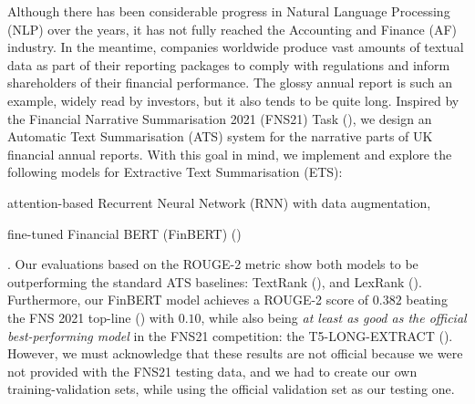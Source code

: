 Although there has been considerable progress in Natural Language Processing (NLP) over the years, it has not fully reached the Accounting and Finance (AF) industry.
In the meantime, companies worldwide produce vast amounts of textual data as part of their reporting packages to comply with regulations and inform shareholders of their financial performance.
The glossy annual report is such an example, widely read by investors, but it also tends to be quite long.
Inspired by the Financial Narrative Summarisation 2021 (FNS21) Task (\cite{zmandar-etal-2021-financial}),
we design an Automatic Text Summarisation (ATS) system for the narrative parts of UK financial annual reports.
With this goal in mind, we implement and explore the following models for Extractive Text Summarisation (ETS):
\begin{enumerate*}
    \item attention-based Recurrent Neural Network (RNN) with data augmentation,
    \item fine-tuned Financial BERT (FinBERT) (\cite{yang2020finbert})
\end{enumerate*}.
Our evaluations based on the ROUGE-2 metric show both models to be outperforming the standard ATS baselines: TextRank (\cite{mihalcea-tarau-2004-textrank}), and LexRank (\cite{Erkan2004LexRankGC}).
Furthermore, our FinBERT model achieves a ROUGE-2 score of $0.382$ beating the FNS 2021 top-line (\cite{litvak-last-2013-multilingual}) with $0.10$, while also
being \emph{at least as good as the official best-performing model} in the FNS21 competition: the T5-LONG-EXTRACT (\cite{orzhenovskii-2021-t5}).
However, we must acknowledge that these results are not official because we were not provided with the FNS21 testing data,
and we had to create our own training-validation sets, while using the official validation set as our testing one.